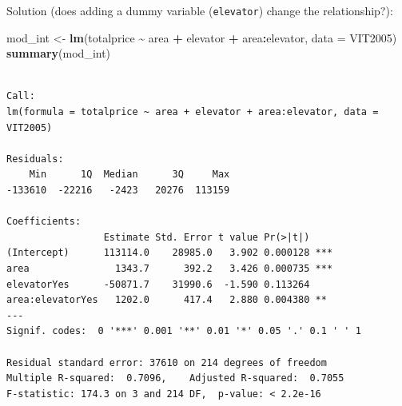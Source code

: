 \documentclass[
  ignorenonframetext,
]{beamer}
\newenvironment{Shaded}{\begin{snugshade}}{\end{snugshade}}
\newcommand{\AttributeTok}[1]{\textcolor[rgb]{0.13,0.29,0.53}{#1}}
\newcommand{\FunctionTok}[1]{\textcolor[rgb]{0.13,0.29,0.53}{\textbf{#1}}}
\newcommand{\NormalTok}[1]{#1}
\newcommand{\OtherTok}[1]{\textcolor[rgb]{0.56,0.35,0.01}{#1}}
\newcommand{\SpecialCharTok}[1]{\textcolor[rgb]{0.81,0.36,0.00}{\textbf{#1}}}
\begin{document}
\begin{frame}[fragile]{Solution (does adding a dummy variable
(\texttt{elevator}) change the relationship?):}
\protect\hypertarget{solution-does-adding-a-dummy-variable-elevator-change-the-relationship-1}{}
\scriptsize

\begin{Shaded}
\begin{Highlighting}[]
\NormalTok{mod\_int }\OtherTok{\textless{}{-}} \FunctionTok{lm}\NormalTok{(totalprice }\SpecialCharTok{\textasciitilde{}}\NormalTok{ area }\SpecialCharTok{+}\NormalTok{ elevator }\SpecialCharTok{+}\NormalTok{ area}\SpecialCharTok{:}\NormalTok{elevator, }\AttributeTok{data =}\NormalTok{ VIT2005)}
\FunctionTok{summary}\NormalTok{(mod\_int)}
\end{Highlighting}
\end{Shaded}

\begin{verbatim}

Call:
lm(formula = totalprice ~ area + elevator + area:elevator, data = VIT2005)

Residuals:
    Min      1Q  Median      3Q     Max 
-133610  -22216   -2423   20276  113159 

Coefficients:
                 Estimate Std. Error t value Pr(>|t|)    
(Intercept)      113114.0    28985.0   3.902 0.000128 ***
area               1343.7      392.2   3.426 0.000735 ***
elevatorYes      -50871.7    31990.6  -1.590 0.113264    
area:elevatorYes   1202.0      417.4   2.880 0.004380 ** 
---
Signif. codes:  0 '***' 0.001 '**' 0.01 '*' 0.05 '.' 0.1 ' ' 1

Residual standard error: 37610 on 214 degrees of freedom
Multiple R-squared:  0.7096,    Adjusted R-squared:  0.7055 
F-statistic: 174.3 on 3 and 214 DF,  p-value: < 2.2e-16
\end{verbatim}

\normalsize
\end{frame}
\end{document}
